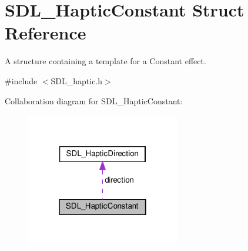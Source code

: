 \hypertarget{structSDL__HapticConstant}{}\section{S\+D\+L\+\_\+\+Haptic\+Constant Struct Reference}
\label{structSDL__HapticConstant}


A structure containing a template for a Constant effect.  




{\ttfamily \#include $<$S\+D\+L\+\_\+haptic.\+h$>$}



Collaboration diagram for S\+D\+L\+\_\+\+Haptic\+Constant\+:\nopagebreak
\begin{figure}[H]
\begin{center}
\leavevmode
\includegraphics[width=190pt]{structSDL__HapticConstant__coll__graph}
\end{center}
\end{figure}
